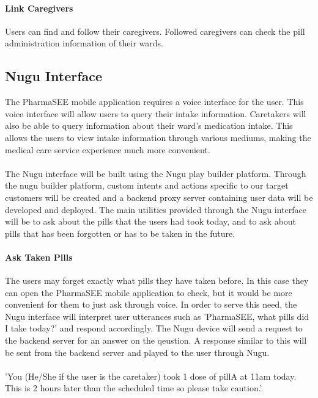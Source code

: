 \documentclass[conference]{IEEEtran}
\begin{document}
\paragraph{Link Caregivers}
Users can find and follow their caregivers. Followed caregivers can check the pill administration information of their wards.\\

\subsection{Nugu Interface}
The PharmaSEE mobile application requires a voice interface for the user. This voice interface will allow users to query their intake information. Caretakers will also be able to query information about their ward's medication intake. This allows the users to view intake information through various mediums, making the medical care service experience much more convenient. \\ \\
The Nugu interface will be built using the Nugu play builder platform. Through the nugu builder platform, custom intents and actions specific to our target customers will be created and a backend proxy server containing user data will be developed and deployed. The main utilities provided through the Nugu interface will be to ask about the pills that the users had took today, and to ask about pills that has been forgotten or has to be taken in the future. \\

\paragraph{Ask Taken Pills}
The users may forget exactly what pills they have taken before. In this case they can open the PharmaSEE mobile application to check, but it would be more convenient for them to just ask through voice. In order to serve this need, the Nugu interface will interpret user utterances such as 'PharmaSEE, what pills did I take today?' and respond accordingly. The Nugu device will send a request to the backend server for an answer on the qeustion. A response similar to this will be sent from the backend server and played to the user through Nugu. \\ \\
'You (He/She if the user is the caretaker) took 1 dose of pillA at 11am today. This is 2 hours later than the scheduled time so please take caution.'. \\
\end{document}
